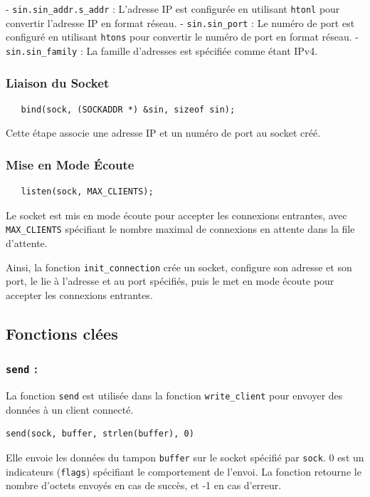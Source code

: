 \documentclass{article}
\begin{document}
- \texttt{sin.sin_addr.s_addr} : L'adresse IP est configurée en utilisant \texttt{htonl} pour convertir l'adresse IP en format réseau.
- \texttt{sin.sin_port} : Le numéro de port est configuré en utilisant \texttt{htons} pour convertir le numéro de port en format réseau.
- \texttt{sin.sin_family} : La famille d'adresses est spécifiée comme étant IPv4.

\subsubsection*{Liaison du Socket}

\begin{verbatim}
   bind(sock, (SOCKADDR *) &sin, sizeof sin);
\end{verbatim}

Cette étape associe une adresse IP et un numéro de port au socket créé.

\subsubsection*{Mise en Mode Écoute}

\begin{verbatim}
   listen(sock, MAX_CLIENTS);
\end{verbatim}

Le socket est mis en mode écoute pour accepter les connexions entrantes, avec \texttt{MAX_CLIENTS} spécifiant le nombre maximal de connexions en attente dans la file d'attente.

Ainsi, la fonction \texttt{init_connection} crée un socket, configure son adresse et son port, le lie à l'adresse et au port spécifiés, puis le met en mode écoute pour accepter les connexions entrantes.

\subsection{Fonctions clées}
\subsubsection*{\texttt{send} : }
La fonction \texttt{send} est utilisée dans la fonction \texttt{write_client} pour envoyer des données à un client connecté. 
\begin{verbatim}
send(sock, buffer, strlen(buffer), 0)
\end{verbatim}
Elle envoie les données du tampon \texttt{buffer} sur le socket spécifié par \texttt{sock}. 0 est un indicateurs (\texttt{flags}) spécifiant le comportement de l'envoi. La fonction retourne le nombre d'octets envoyés en cas de succès, et -1 en cas d'erreur.
\end{document}
